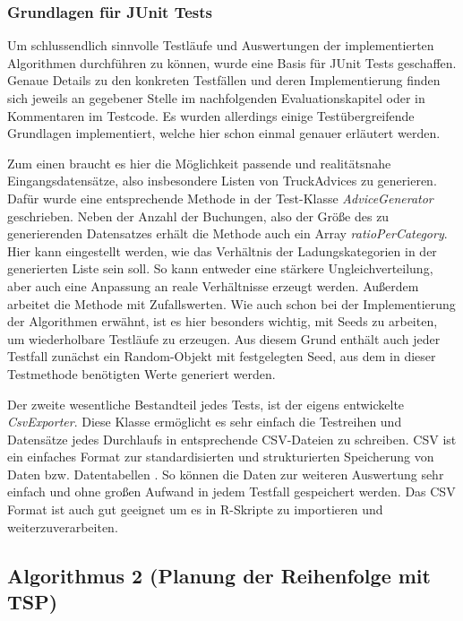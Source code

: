 \subsubsection{Grundlagen für JUnit Tests}


Um schlussendlich sinnvolle Testläufe und Auswertungen der implementierten Algorithmen durchführen zu können, wurde eine Basis für JUnit Tests geschaffen. Genaue Details zu den konkreten Testfällen und deren Implementierung finden sich jeweils an gegebener Stelle im nachfolgenden Evaluationskapitel oder in Kommentaren im Testcode. Es wurden allerdings einige Testübergreifende Grundlagen implementiert, welche hier schon einmal genauer erläutert werden.

Zum einen braucht es hier die Möglichkeit passende und realitätsnahe Eingangsdatensätze, also insbesondere Listen von TruckAdvices zu generieren. Dafür wurde eine entsprechende Methode in der Test-Klasse \textit{AdviceGenerator} geschrieben. Neben der Anzahl der Buchungen, also der Größe des zu generierenden Datensatzes erhält die Methode auch ein Array \textit{ratioPerCategory}. Hier kann eingestellt werden, wie das Verhältnis der Ladungskategorien in der generierten Liste sein soll. So kann entweder eine stärkere Ungleichverteilung, aber auch eine Anpassung an reale Verhältnisse erzeugt werden. Außerdem arbeitet die Methode mit Zufallswerten. Wie auch schon bei der Implementierung der Algorithmen erwähnt, ist es hier besonders wichtig, mit Seeds zu arbeiten, um wiederholbare Testläufe zu erzeugen. Aus diesem Grund enthält auch jeder Testfall zunächst ein Random-Objekt mit festgelegten Seed, aus dem in dieser Testmethode benötigten Werte generiert werden.

Der zweite wesentliche Bestandteil jedes Tests, ist der eigens entwickelte \textit{CsvExporter}. Diese Klasse ermöglicht es sehr einfach die Testreihen und Datensätze jedes Durchlaufs in entsprechende CSV-Dateien zu schreiben. CSV ist ein einfaches Format zur standardisierten und strukturierten Speicherung von Daten bzw. Datentabellen \cite{csvFormat}. So können die Daten zur weiteren Auswertung sehr einfach und ohne großen Aufwand in jedem Testfall gespeichert werden. Das CSV Format ist auch gut geeignet um es in R-Skripte zu importieren und weiterzuverarbeiten.



\subsection{Algorithmus 2 (Planung der Reihenfolge mit TSP)}

